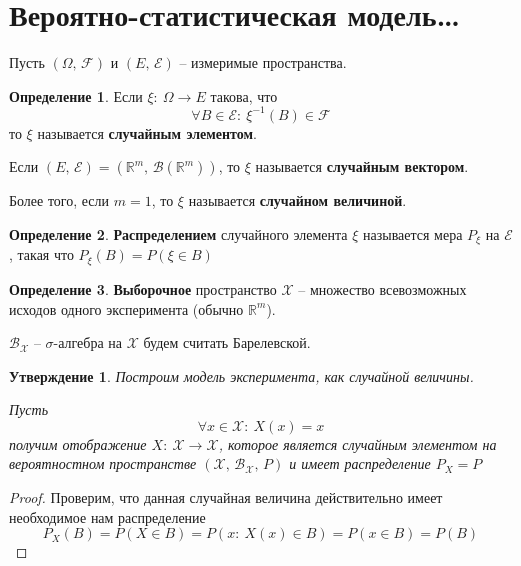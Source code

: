 \documentclass[a4paper,12pt]{article}
\theoremstyle{plain}
\newtheorem{proposition}{Утверждение}[section]
\theoremstyle{definition}
\newtheorem{definition}{Определение}[section]
\theoremstyle{remark}
\begin{document}
\section{Вероятно-статистическая модель\dots}
Пусть $(\Omega,\, \mathcal{F})$ и $(E,\, \mathcal{E})$ -- измеримые пространства.

\begin{definition}
  Если $\xi :\: \Omega \to E$ такова, что
  \[
    \forall B \in \mathcal{E} :\: \xi^{-1}(B) \in \mathcal{F}
  \]
  то $\xi$ называется \textbf{случайным элементом}.

  Если $(E,\, \mathcal{E}) = (\mathbb{R}^m,\, \mathcal{B}(\mathbb{R}^m))$, то $\xi$ называется \textbf{случайным вектором}.

  Более того, если $m = 1$, то $\xi$ называется \textbf{случайном величиной}.
\end{definition}

\begin{definition}
  \textbf{Распределением} случайного элемента $\xi$ называется мера $P_\xi$ на $\mathcal{E}$, такая что $P_\xi(B) = P(\xi \in B)$
\end{definition}

\begin{definition}
  \textbf{Выборочное} пространство $\mathcal{X}$ -- множество всевозможных исходов одного эксперимента (обычно $\mathbb{R}^m$).

  $\mathcal{B}_\mathcal{X}$ -- $\sigma$-алгебра на $\mathcal{X}$ будем считать Барелевской.
\end{definition}

\begin{proposition}
  Построим модель эксперимента, как случайной величины.

  Пусть 
  \[
    \forall x \in \mathcal{X} :\: X(x) = x
  \]
  получим отображение $X :\: \mathcal{X} \to \mathcal{X}$, которое является случайным элементом на вероятностном пространстве $(\mathcal{X},\, \mathcal{B}_\mathcal{X},\, P)$ и имеет распределение $P_X = P$
\end{proposition}

\begin{proof}
  Проверим, что данная случайная величина действительно имеет необходимое нам распределение
  \[
    P_X(B) = P(X \in B) = P(x :\: X(x) \in B) = P(x \in B) = P(B)
  \]
\end{proof}
\end{document}
